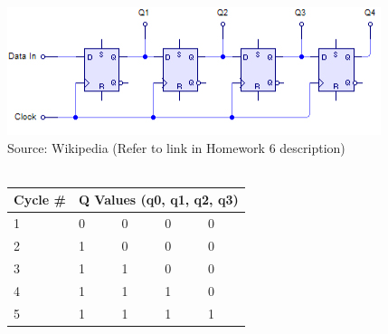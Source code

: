 \documentclass[letterpaper]{article} %
\begin{document}
\begin{enumerate}
  \includegraphics[scale=0.5]{wiki} \\ Source: Wikipedia (Refer to link in Homework 6 description) \\ \\
  \begin{tabular}{|l|llll|}
    \hline
    Cycle \# & \multicolumn{4}{|l|}{Q Values (q0, q1, q2, q3)} \\
    \hline
    1        & 0         & 0         & 0         & 0         \\
    2        & 1         & 0         & 0         & 0         \\
    3        & 1         & 1         & 0         & 0         \\
    4        & 1         & 1         & 1         & 0         \\
    5        & 1         & 1         & 1         & 1  \\
    \hline
  \end{tabular}
\end{enumerate}
\end{document}
